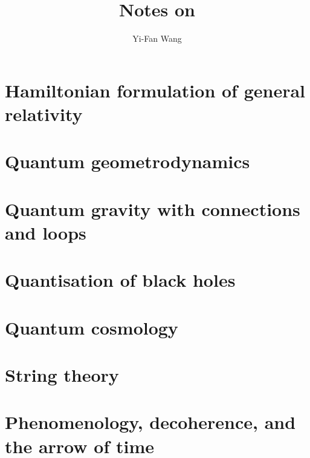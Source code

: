 \documentclass[a4paper]{article}
\title{Notes on \cite{Kiefer_2012}}
\author{Yi-Fan Wang}
\begin{document}
\maketitle


\tableofcontents








\section{Hamiltonian formulation of general relativity}
\section{Quantum geometrodynamics}
\section{Quantum gravity with connections and loops}
\section{Quantisation of black holes}
\section{Quantum cosmology}
\section{String theory}
\section{Phenomenology, decoherence, and the arrow of time}




\printbibliography
\end{document}
